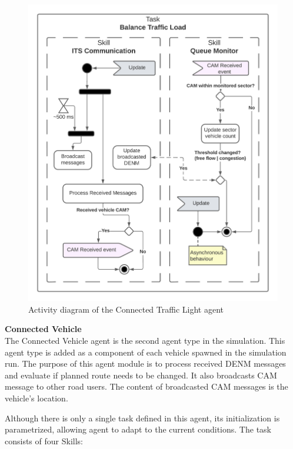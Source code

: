 \documentclass[main.tex]{subfiles}
\begin{document}
\begin{figure}[htbp]
    \centering
    \includegraphics[width=.8\textwidth]{SmartTrafficLight.png}
    \caption{Activity diagram of the Connected Traffic Light agent}
    \label{ad-trafficLight}
\end{figure}

\textbf{Connected Vehicle} \smallskip \\
The Connected Vehicle agent is the second agent type in the simulation. This agent type is 
added as a component of each vehicle spawned in the simulation run. The purpose of this 
agent module is to process received DENM messages and evaluate if planned route needs 
to be changed. It also broadcasts CAM message to other road users. The content of 
broadcasted CAM messages is the vehicle's location.

Although there is only a single task defined in this agent, its initialization is 
parametrized, allowing agent to adapt to the current conditions. The task consists of 
four Skills:
\end{document}
